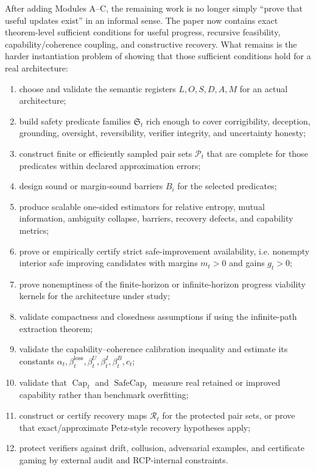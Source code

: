 \documentclass[11pt]{article}
\newcommand{\Pcal}{\mathcal{P}}
\newcommand{\Rcal}{\mathcal{R}}
\newcommand{\1}{\mathbf{1}}
\newcommand{\loss}{\mathrm{loss}}
\renewcommand{\Cap}{\operatorname{Cap}}
\providecommand{\SafeCap}{\operatorname{SafeCap}}
\begin{document}
After adding Modules A--C, the remaining work is no longer simply ``prove that useful updates exist'' in an informal sense.  The paper now contains exact theorem-level sufficient conditions for useful progress, recursive feasibility, capability/coherence coupling, and constructive recovery.  What remains is the harder instantiation problem of showing that those sufficient conditions hold for a real architecture:
\begin{enumerate}
    \item choose and validate the semantic registers \(L,O,S,D,A,M\) for an actual architecture;
    \item build safety predicate families \(\mathfrak S_t\) rich enough to cover corrigibility, deception, grounding, oversight, reversibility, verifier integrity, and uncertainty honesty;
    \item construct finite or efficiently sampled pair sets \(\Pcal_t\) that are complete for those predicates within declared approximation errors;
    \item design sound or margin-sound barriers \(B_i\) for the selected predicates;
    \item produce scalable one-sided estimators for relative entropy, mutual information, ambiguity collapse, barriers, recovery defects, and capability metrics;
    \item prove or empirically certify strict safe-improvement availability, i.e. nonempty interior safe improving candidates with margins \(m_t>0\) and gains \(g_t>0\);
    \item prove nonemptiness of the finite-horizon or infinite-horizon progress viability kernels for the architecture under study;
    \item validate compactness and closedness assumptions if using the infinite-path extraction theorem;
    \item validate the capability--coherence calibration inequality and estimate its constants \(\alpha_t,\beta_t^{\loss},\beta_t^U,\beta_t^I,\beta_t^B,c_t\);
    \item validate that \(\Cap_t\) and \(\SafeCap_t\) measure real retained or improved capability rather than benchmark overfitting;
    \item construct or certify recovery maps \(\Rcal_t\) for the protected pair sets, or prove that exact/approximate Petz-style recovery hypotheses apply;
    \item protect verifiers against drift, collusion, adversarial examples, and certificate gaming by external audit and RCP-internal constraints.
\end{enumerate}
\end{document}
